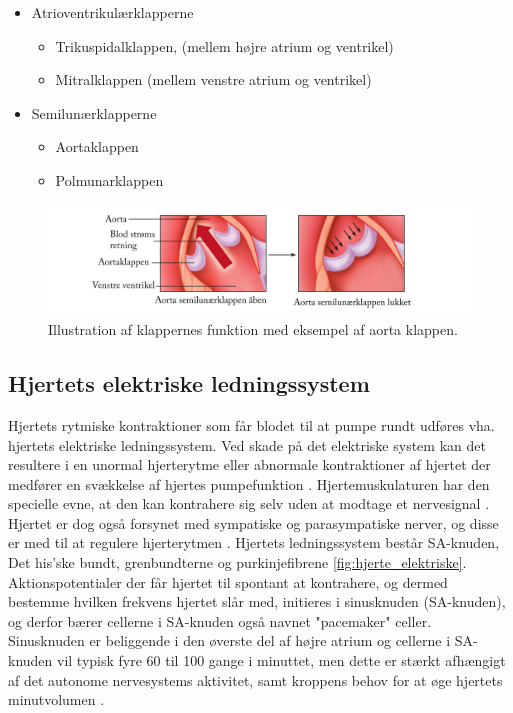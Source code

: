 \begin{itemize} 
	\item Atrioventrikulærklapperne
		\begin{itemize} 

			\item Trikuspidalklappen, (mellem højre atrium og ventrikel)
			\item Mitralklappen (mellem venstre atrium og ventrikel)

		\end{itemize} 


	\item Semilunærklapperne

		\begin{itemize} 

			\item Aortaklappen
			\item Polmunarklappen

		\end{itemize} 		
\end{itemize} 


\begin{figure}[H] %
\begin{center}
\includegraphics[width=1\textwidth]{figures/cusp}
\end{center}
\caption{Illustration af klappernes funktion med eksempel af aorta klappen. \cite{cindy}}
\label{fig:hjerte_klap}
\end{figure}

\subsection{Hjertets elektriske ledningssystem}\label{Hjertets_elektriske_ledningssystem}
Hjertets rytmiske kontraktioner som får blodet til at pumpe rundt udføres vha. hjertets elektriske ledningssystem. Ved skade på det elektriske system kan det resultere i en unormal hjerterytme eller abnormale kontraktioner af hjertet der medfører en svækkelse af hjertes pumpefunktion \cite{guyton}. Hjertemuskulaturen har den specielle evne, at den kan kontrahere sig selv uden at modtage et nervesignal \cite{gronanatomi}. Hjertet er dog også forsynet med sympatiske og parasympatiske nerver, og disse er med til at regulere hjerterytmen \cite{cindy}. 
Hjertets ledningssystem består SA-knuden, Det his'ske bundt, grenbundterne og purkinjefibrene \ref{fig:hjerte_elektriske}.
Aktionspotentialer der får hjertet til spontant at kontrahere, og dermed bestemme hvilken frekvens hjertet slår med, initieres i sinusknuden (SA-knuden), og derfor bærer cellerne i SA-knuden også navnet "pacemaker" celler.
Sinusknuden er beliggende i den øverste del af højre atrium og cellerne i SA-knuden vil typisk fyre 60 til 100 gange i minuttet, men dette er stærkt afhængigt af det autonome nervesystems aktivitet, samt kroppens behov for at øge hjertets
minutvolumen \cite{ekgbook}.


